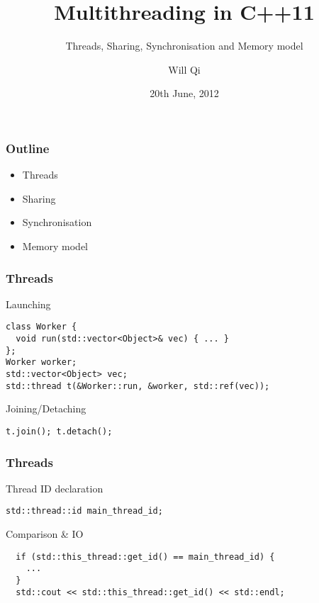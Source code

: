 \documentclass{beamer}
\title{Multithreading in C++11}
\subtitle{Threads, Sharing, Synchronisation and Memory model}
\author{Will Qi}
\date{20th June, 2012}
\begin{document}
\maketitle

\begin{frame}
  \frametitle{Outline}
  \begin{itemize}
  \item Threads
    \pause
  \item Sharing
    \pause
  \item Synchronisation
    \pause
  \item Memory model
  \end{itemize}
\end{frame}

\begin{frame}[fragile]
  \frametitle{Threads}
  \begin{block}{Launching}
\begin{verbatim}
class Worker {
  void run(std::vector<Object>& vec) { ... }
};
Worker worker;
std::vector<Object> vec;
std::thread t(&Worker::run, &worker, std::ref(vec));
\end{verbatim}
  \end{block}
  \pause
  \begin{block}{Joining/Detaching}
\begin{verbatim}
t.join(); t.detach();
\end{verbatim}
  \end{block}
\end{frame}

\begin{frame}[fragile]
  \frametitle{Threads}
  \begin{block}{Thread ID declaration}
\begin{verbatim}
std::thread::id main_thread_id;
\end{verbatim}
  \end{block}
  \pause
  \begin{block}{Comparison \& IO}
\begin{verbatim}
  if (std::this_thread::get_id() == main_thread_id) {
    ...
  }
  std::cout << std::this_thread::get_id() << std::endl;
\end{verbatim}
  \end{block}
\end{frame}
\end{document}
